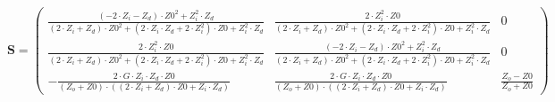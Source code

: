 \begin{equation} \mathbf{S} = \left(\begin{smallmatrix}
\frac{\left(-2\cdot Z_i - Z_d \right)\cdot Z0^2+ Z_i ^2\cdot Z_d
}{\left(2\cdot Z_i + Z_d \right)\cdot Z0^2+\left(2\cdot Z_i \cdot Z_d
+2\cdot Z_i ^2\right)\cdot Z0+ Z_i ^2\cdot Z_d } & \frac{2\cdot Z_i
^2\cdot Z0}{\left(2\cdot Z_i + Z_d \right)\cdot Z0^2+\left(2\cdot Z_i
\cdot Z_d +2\cdot Z_i ^2\right)\cdot Z0+ Z_i ^2\cdot Z_d } & 0 \\
\frac{2\cdot Z_i ^2\cdot Z0}{\left(2\cdot Z_i + Z_d \right)\cdot
Z0^2+\left(2\cdot Z_i \cdot Z_d +2\cdot Z_i ^2\right)\cdot Z0+ Z_i
^2\cdot Z_d } & \frac{\left(-2\cdot Z_i - Z_d \right)\cdot Z0^2+ Z_i
^2\cdot Z_d }{\left(2\cdot Z_i + Z_d \right)\cdot Z0^2+\left(2\cdot
Z_i \cdot Z_d +2\cdot Z_i ^2\right)\cdot Z0+ Z_i ^2\cdot Z_d } & 0 \\
-\frac{2\cdot G \cdot Z_i \cdot Z_d \cdot Z0}{\left( Z_o
+Z0\right)\cdot \left(\left(2\cdot Z_i + Z_d \right)\cdot Z0+ Z_i
\cdot Z_d \right)} & \frac{2\cdot G \cdot Z_i \cdot Z_d \cdot
Z0}{\left( Z_o +Z0\right)\cdot \left(\left(2\cdot Z_i + Z_d
\right)\cdot Z0+ Z_i \cdot Z_d \right)} & \frac{ Z_o -Z0}{ Z_o +Z0}
\end{smallmatrix}\right) \end{equation}
